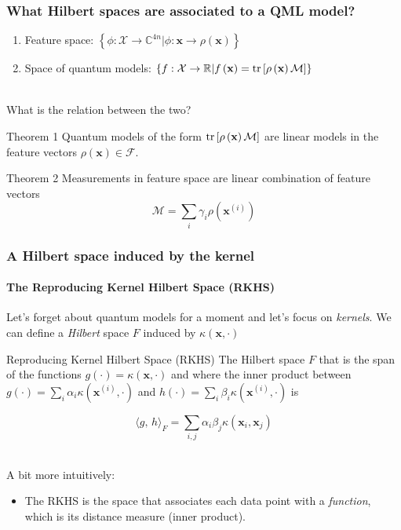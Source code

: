 \documentclass[aspectratio=43]{beamer}
\newcommand{\R}{\mathbb{R}}  %
\newcommand{\inner}[2]{\langle #1,\, #2\rangle}
\begin{document}
\begin{frame}
  \frametitle{What Hilbert spaces are associated to a QML model?}

  \begin{enumerate}
    \item Feature space: $\left\{ \phi:\mathcal{X}\rightarrow \mathbb{C}^{4n}| \phi:\mathbf{x}\rightarrow \rho\left( \mathbf{x} \right) \right\}$
    \item Space of quantum models: $\left\{ f:\mathcal{X}\rightarrow\R| f\left( \mathbf{x} \right)=\tr\left[ \rho\left( \mathbf{x} \right)\mathcal{M} \right] \right\}$
  \end{enumerate}

  \ \\
  What is the relation between the two?
  \begin{block}{Theorem 1}
    Quantum models of the form $\tr\left[\rho\left( \mathbf{x} \right)\mathcal{M}\right]$ are linear models in the feature vectors $\rho\left( \mathbf{x} \right)\in \mathcal{F}$.
  \end{block}

  \begin{block}{Theorem 2}
    Measurements in feature space are linear combination of feature vectors
    \[\mathcal{M} = \sum_i \gamma_i \rho\left( \mathbf{x}^{(i)} \right)\]
  \end{block}

\end{frame}


\begin{frame}
  \frametitle{A Hilbert space induced by the kernel}
  \framesubtitle{The Reproducing Kernel Hilbert Space (RKHS)}
  
  Let's forget about quantum models for a moment and let's focus on \emph{kernels}. We can define a \emph{Hilbert} space $F$ induced by $\kappa\left( \mathbf{x}, \cdot \right)$

  \begin{exampleblock}{Reproducing Kernel Hilbert Space (RKHS)}
    The Hilbert space $F$ that is the span of the functions $g(\cdot)=\kappa\left( \mathbf{x}, \cdot\right)$ and where the inner product between $g(\cdot)=\sum_i \alpha_i \kappa\left( \mathbf{x}^{(i)}, \cdot\right)$ and $h(\cdot)=\sum_i \beta_i \kappa\left( \mathbf{x}^{(i)}, \cdot\right)$ is

    \[\inner{g}{h}_F = \sum_{i,j} \alpha_i \beta_j \kappa\left( \mathbf{x}_i, \mathbf{x}_j \right)\]
  \end{exampleblock}

  \ \\
  A bit more intuitively:
  \begin{itemize}
    \item The RKHS is the space that associates each data point with a \emph{function}, which is its distance measure (inner product).
  \end{itemize}
  
\end{frame}
\end{document}
